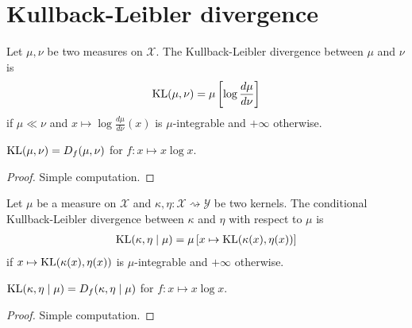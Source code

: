 \section{Kullback-Leibler divergence}

\begin{definition}
  \label{def:KL}
  \leanok
  Let $\mu, \nu$ be two measures on $\mathcal X$. The Kullback-Leibler divergence between $\mu$ and $\nu$ is
  \begin{align*}
  \operatorname{KL}(\mu, \nu) = \mu\left[\log \frac{d \mu}{d \nu}\right]
  \end{align*}
  if $\mu \ll \nu$ and $x \mapsto \log \frac{d \mu}{d \nu}(x)$ is $\mu$-integrable and $+\infty$ otherwise.
\end{definition}

\begin{lemma}
  \label{lem:kl_eq_fDiv}
  \leanok
  $\operatorname{KL}(\mu, \nu) = D_f(\mu, \nu)$ for $f: x \mapsto x \log x$.
\end{lemma}

\begin{proof}\leanok
Simple computation.
\end{proof}

\begin{definition}
  \label{def:condKL}
  \leanok
  Let $\mu$ be a measure on $\mathcal X$ and $\kappa, \eta : \mathcal X \rightsquigarrow \mathcal Y$ be two kernels. The conditional Kullback-Leibler divergence between $\kappa$ and $\eta$ with respect to $\mu$ is
  \begin{align*}
  \operatorname{KL}(\kappa, \eta \mid \mu) = \mu\left[x \mapsto \operatorname{KL}(\kappa(x), \eta(x))\right]
  \end{align*}
  if $x \mapsto \operatorname{KL}(\kappa(x), \eta(x))$ is $\mu$-integrable and $+\infty$ otherwise.
\end{definition}

\begin{lemma}
  \label{lem:condKL_eq_condFDiv}
  \leanok
  $\operatorname{KL}(\kappa, \eta \mid \mu) = D_f(\kappa, \eta \mid \mu)$ for $f: x \mapsto x \log x$.
\end{lemma}

\begin{proof}\leanok
Simple computation.
\end{proof}

